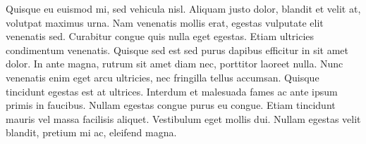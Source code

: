 Quisque eu euismod mi, sed vehicula nisl. Aliquam justo dolor, blandit et velit at, volutpat maximus urna. Nam venenatis mollis erat, egestas vulputate elit venenatis sed. Curabitur congue quis nulla eget egestas. Etiam ultricies condimentum venenatis. Quisque sed est sed purus dapibus efficitur in sit amet dolor. In ante magna, rutrum sit amet diam nec, porttitor laoreet nulla. Nunc venenatis enim eget arcu ultricies, nec fringilla tellus accumsan. Quisque tincidunt egestas est at ultrices. Interdum et malesuada fames ac ante ipsum primis in faucibus. Nullam egestas congue purus eu congue. Etiam tincidunt mauris vel massa facilisis aliquet. Vestibulum eget mollis dui. Nullam egestas velit blandit, pretium mi ac, eleifend magna.
